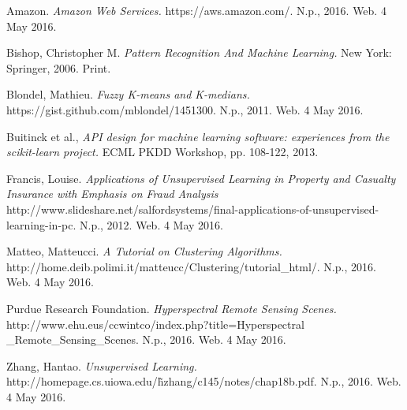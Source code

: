 \documentclass[journal]{IEEEtran}
\begin{document}
\ifCLASSOPTIONcaptionsoff
  \newpage
\fi

\begin{thebibliography}{1}

  Amazon. \emph{Amazon Web Services.} https://aws.amazon.com/. N.p., 2016. Web. 4 May 2016.

  Bishop, Christopher M. \emph{Pattern Recognition And Machine Learning.} New York: Springer, 2006. Print.

  Blondel, Mathieu. \emph{Fuzzy K-means and K-medians.} https://gist.github.com/mblondel/1451300. N.p., 2011. Web. 4 May 2016.

  Buitinck et al., \emph{API design for machine learning software: experiences from the scikit-learn project.} ECML PKDD Workshop, pp. 108-122, 2013.

  Francis, Louise. \emph{Applications of Unsupervised Learning in Property and Casualty Insurance with Emphasis on Fraud Analysis} http://www.slideshare.net/salfordsystems/final-applications-of-unsupervised-learning-in-pc. N.p., 2012. Web. 4 May 2016.

  Matteo, Matteucci. \emph{A Tutorial on Clustering Algorithms.} http://home.deib.polimi.it/matteucc/Clustering/tutorial\_html/. N.p., 2016. Web. 4 May 2016.

  Purdue Research Foundation. \emph{Hyperspectral Remote Sensing Scenes.} http://www.ehu.eus/ccwintco/index.php?title=Hyperspectral \_Remote\_Sensing\_Scenes. N.p., 2016. Web. 4 May 2016.

  Zhang, Hantao. \emph{Unsupervised Learning.} http://homepage.cs.uiowa.edu/\~hzhang/c145/notes/chap18b.pdf. N.p., 2016. Web. 4 May 2016.

\end{thebibliography}
\end{document}
